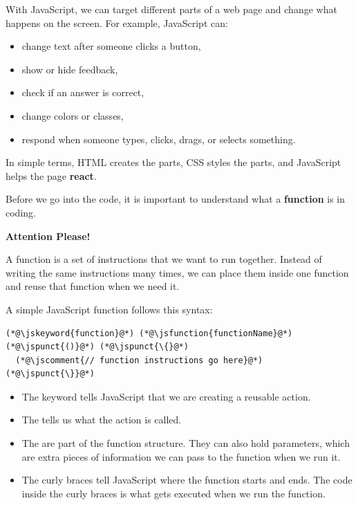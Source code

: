 \documentclass{article}
\begin{document}
With JavaScript, we can target different parts of a web page and change what happens on the screen.
For example, JavaScript can:

\begin{itemize}
  \item change text after someone clicks a button,
  \item show or hide feedback,
  \item check if an answer is correct,
  \item change colors or classes,
  \item respond when someone types, clicks, drags, or selects something.
\end{itemize}

In simple terms, HTML creates the parts, CSS styles the parts, and JavaScript helps the page \textbf{react}.
\vspace{0.3cm}

Before we go into the code, it is important to understand what a \textbf{function} is in coding.

\begin{attentionbox}
  \textbf{\Bitter\textcolor{naranja}{Attention Please!}}

  A function is a set of instructions that we want to run together.
  Instead of writing the same instructions many times, we can place them inside one function and reuse that function when we need it.
\end{attentionbox}

A simple JavaScript function follows this syntax:

\begin{lstlisting}
(*@\jskeyword{function}@*) (*@\jsfunction{functionName}@*)(*@\jspunct{()}@*) (*@\jspunct{\{}@*)
  (*@\jscomment{// function instructions go here}@*)
(*@\jspunct{\}}@*)
\end{lstlisting}

\begin{itemize}
  \item The  keyword tells JavaScript that we are creating a reusable action.
  \item The  tells us what the action is called.
  \item The \inlinejsmethod{()} are part of the function structure. They can also hold parameters, which are extra pieces of information we can pass to the function when we run it.
  \item The curly braces \inlinejsmethod{\{\}} tell JavaScript where the function starts and ends. The code inside the curly braces is what gets executed when we run the function.
\end{itemize}
\end{document}
